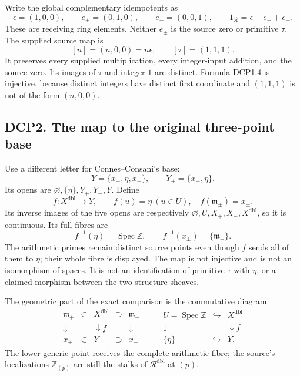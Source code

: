 Write the global complementary idempotents as \[
 \epsilon=(1,0,0),\qquad
 e_+=(0,1,0),\qquad e_-=(0,0,1),\qquad
 1_{\mathcal R}=\epsilon+e_++e_-.
\tag{DCP1.3}
\] These are receiving ring elements. Neither \(e_\pm\) is the source
zero or primitive \(\tau\). The supplied source map is \[
 [n]=(n,0,0)=n\epsilon,\qquad [\tau]=(1,1,1).
\tag{DCP1.4}
\] It preserves every supplied multiplication, every integer-input
addition, and the source zero. Its images of \(\tau\) and integer \(1\)
are distinct. Formula DCP1.4 is injective, because distinct integers
have distinct first coordinate and \((1,1,1)\) is not of the form
\((n,0,0)\).

\subsection{DCP2. The map to the original three-point
base}\label{dcp2.-the-map-to-the-original-three-point-base}

Use a different letter for Connes--Consani's base: \[
 Y=\{x_+,\eta,x_-\},\qquad
 Y_\pm=\{x_\pm,\eta\}.
\] Its opens are \(\varnothing,\{\eta\},Y_+,Y_-,Y\). Define \[
 f:X^{\mathrm{dbl}}\longrightarrow Y,\qquad
 f(u)=\eta\ (u\in U),\quad f(\mathfrak m_\pm)=x_\pm .
\tag{DCP2.1}
\] Its inverse images of the five opens are respectively
\(\varnothing,U,X_+,X_-,X^{\mathrm{dbl}}\), so it is continuous. Its
full fibres are \[
 f^{-1}(\eta)=\operatorname{Spec}\mathbb Z,\qquad
 f^{-1}(x_\pm)=\{\mathfrak m_\pm\}.
\tag{DCP2.2}
\] The arithmetic primes remain distinct source points even though \(f\)
sends all of them to \(\eta\); their whole fibre is displayed. The map
is not injective and is not an isomorphism of spaces. It is not an
identification of primitive \(\tau\) with \(\eta\), or a claimed
morphism between the two structure sheaves.

The geometric part of the exact comparison is the commutative diagram \[
\begin{array}{ccccc}
 \mathfrak m_+&\subset&X^{\mathrm{dbl}}&\supset&\mathfrak m_-\\
 \downarrow&&\downarrow f&&\downarrow\\
 x_+&\subset&Y&\supset&x_-
\end{array}
\qquad
\begin{array}{ccc}
 U=\operatorname{Spec}\mathbb Z&\hookrightarrow&X^{\mathrm{dbl}}\\
 \downarrow&&\downarrow f\\
 \{\eta\}&\hookrightarrow&Y .
\end{array}
\tag{DCP2.3}
\] The lower generic point receives the complete arithmetic fibre; the
source's localizations \(\mathbb Z_{(p)}\) are still the stalks of
\(\mathcal R^{\mathrm{dbl}}\) at \((p)\).

